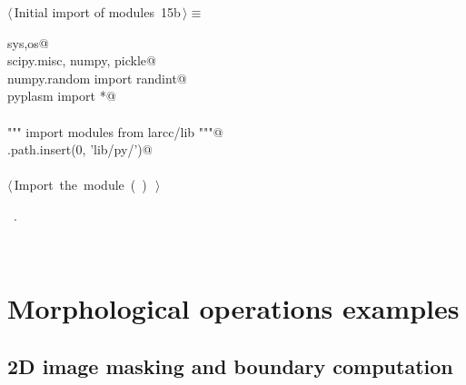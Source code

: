 \documentclass[11pt,oneside]{article}	%
\begin{document}
\begin{flushleft} \small
\begin{minipage}{\linewidth} \label{scrap27}
\protect{}$\langle\,$Initial import of modules\nobreak\ {\footnotesize 15b}$\,\rangle\equiv$
\vspace{-1ex}
\begin{list}{}{} \item
\mbox{}\verb@import sys,os@\\
\mbox{}\verb@import scipy.misc, numpy, pickle@\\
\mbox{}\verb@from numpy.random import randint@\\
\mbox{}\verb@from pyplasm import *@\\
\mbox{}\verb@@\\
\mbox{}\verb@""" import modules from larcc/lib """@\\
\mbox{}\verb@sys.path.insert(0, 'lib/py/')@\\
\mbox{}\verb@@\\
\mbox{}\verb@@\hbox{$\langle\,$Import the module\nobreak\ ({\footnotesize {}\label{scrap28}
 }\mbox{}\verb@largrid@ ) {\footnotesize {}}$\,\rangle$}\verb@@\\
\mbox{}\verb@@{\NWsep}
\end{list}
\vspace{-1ex}
\footnotesize\addtolength{\baselineskip}{-1ex}
\begin{list}{}{\setlength{\itemsep}{-\parsep}\setlength{\itemindent}{-\leftmargin}}
\item \NWtxtMacroRefIn\ .
\end{list}
\end{minipage}\\[4ex]
\end{flushleft}


\section{Morphological operations examples}

\subsection{2D image masking and boundary computation}
\end{document}
